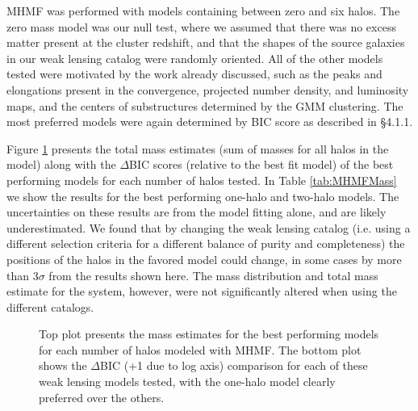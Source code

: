 \documentclass[onecolumn]{aastex}
\begin{document}
MHMF was performed with models containing between zero and six halos.  The zero mass model was our null test, where we assumed that there was no excess matter present at the cluster redshift, and that the shapes of the source galaxies in our weak lensing catalog were randomly oriented.  All of the other models tested were motivated by the work already discussed, such as the peaks and elongations present in the convergence, projected number density, and luminosity maps, and the centers of substructures determined by the GMM clustering.  The most preferred models were again determined by BIC score as described in \S 4.1.1.  

Figure \ref{fig13} presents the total mass estimates (sum of masses for all halos in the model) along with the $\Delta$BIC scores (relative to the best fit model) of the best performing models for each number of halos tested.  In Table \ref{tab:MHMFMass} we show the results for the best performing one-halo and two-halo models.  The uncertainties on these results are from the model fitting alone, and are likely underestimated.  We found that by changing the weak lensing catalog (i.e. using a different selection criteria for a different balance of purity and completeness) the positions of the halos in the favored model could change, in some cases by more than 3$\sigma$ from the results shown here.  The mass distribution and total mass estimate for the system, however, were not significantly altered when using the different catalogs.

\begin{figure}
\caption{Top plot presents the mass estimates for the best performing models for each number of halos modeled with MHMF.  The bottom plot shows the $\Delta$BIC (+1 due to log axis) comparison for each of these weak lensing models tested, with the one-halo model clearly preferred over the others.\label{fig13}} 
\end{figure} 
\end{document}

